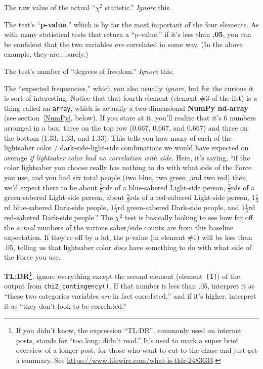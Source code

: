 \begin{compactenum}
\item[0.] The raw value of the actual ``$\chi ^2$ statistic.'' \textit{Ignore}
this.
\item[1.] The test's ``\textbf{p-value},'' which is by far the most important of
the four elements. As with many statistical tests that return a ``p-value,'' if
it's less than \textbf{.05}, you can be confident that the two variables
\textit{are} correlated in some way. (In the above example, they are...barely.)
\item[2.] The test's number of ``degrees of freedom.'' \textit{Ignore} this.
\item[3.] The ``expected frequencies,'' which you also usually \textit{ignore}, but
for the curious it is sort of interesting. Notice that that fourth element
(element \#3 of the list) is a thing called an \texttt{array}, which is
actually a two-dimensional \textbf{NumPy nd-array} (see section~\ref{NumPy},
below). If you stare at it, you'll realize that it's 6 numbers arranged in a
box: three on the top row (0.667, 0.667, and 0.667) and three on the bottom
(1.33, 1.33, and 1.33). This tells you how many of each of the
lightsaber color / dark-side-light-side combinations we would have expected on average
\textit{if lightsaber color had no correlation with side.} Here, it's saying,
``if the color lightsaber you choose really has nothing to do with what side of
the Force you use, and you had six total people (two blue, two green, and two
red) then
we'd expect there to be about $\frac{2}{3}$rds of a blue-sabered Light-side
person, $\frac{2}{3}$rds of a green-sabered Light-side
person,
about $\frac{2}{3}$rds of a red-sabered Light-side person, $1\frac{1}{3}$rd
blue-sabered Dark-side people, 
$1\frac{1}{3}$rd green-sabered Dark-side people, and
$1\frac{1}{3}$rd red-sabered Dark-side people.'' The $\chi ^2$ test is basically
looking to see how far off the \textit{actual} numbers of the various
saber/side counts are from this baseline expectation. If they're off by a
lot, the p-value (in element \#1) will be less than .05, telling us that
lightsaber color \textit{does} have something to do with what side of the Force
you use.
\end{compactenum}

\textbf{TL;DR}\footnote{If you didn't know, the expression ``TL:DR'', commonly
used on internet posts, stands for ``too long; didn't read.'' It's used to mark
a super brief overview of a longer post, for those who want to cut to the chase
and just get a summary. See
\url{https://www.lifewire.com/what-is-tldr-2483633}.}: ignore everything except
the second element (element~\texttt{[1]}) of the output from
\texttt{chi2\_contingency()}. If that number is less than .05, interpret it as
``these two categories variables \textit{are} in fact correlated,'' and if it's
higher, interpret it as ``they don't look to be correlated.''

